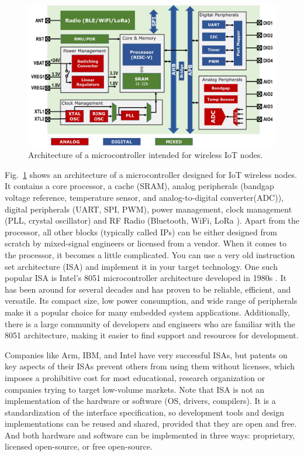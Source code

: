 \documentclass[journal]{IEEEtran}
\begin{document}
\begin{figure}[htb]
    \centering
    \includegraphics[width=0.95\linewidth]{image-uC.jpg}
    \caption{Architecture of a microcontroller intended for wireless IoT nodes.}
    \label{fig:uC}
\end{figure}

Fig.~\ref{fig:uC} shows an architecture of a microcontroller designed for IoT wireless nodes. It contains a core processor, a cache (SRAM), analog peripherals (bandgap voltage reference, temperature sensor, and analog-to-digital converter(ADC)), digital peripherals (UART, SPI, PWM), power management, clock management (PLL, crystal oscillator) and RF Radio (Bluetooth, WiFi, LoRa \cite{sinha_survey_2017, bor_lora_2016}). Apart from the processor, all other blocks (typically called IPs) can be either designed from scratch by mixed-signal engineers or licensed from a vendor. When it comes to the processor, it becomes a little complicated. You can use a very old instruction set architecture (ISA) and implement it in your target technology. One such popular ISA is Intel's 8051 microcontroller architecture developed in 1980s \cite{noauthor_mcs-51_2023}. It has been around for several decades and has proven to be reliable, efficient, and versatile. Its compact size, low power consumption, and wide range of peripherals make it a popular choice for many embedded system applications. Additionally, there is a large community of developers and engineers who are familiar with the 8051 architecture, making it easier to find support and resources for development.

Companies like Arm, IBM, and Intel have very successful ISAs, but patents on key aspects of their ISAs prevent others from using them without licenses, which imposes a prohibitive cost for most educational, research organization or companies trying to target low-volume markets. 
Note that ISA is not an implementation of the hardware or software (OS, drivers, compilers). It is a standardization of the interface specification, so development tools and design implementations can be reused and shared, provided that they are open and free. And both hardware and software can be implemented in three ways: proprietary, licensed open-source, or free open-source.
\end{document}
